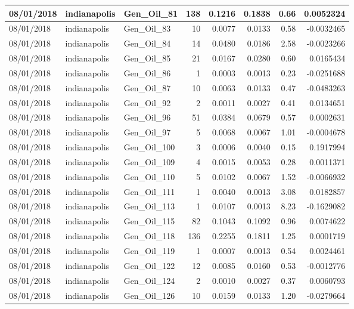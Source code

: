 \documentclass[
  letterpaper,
  DIV=11,
  numbers=noendperiod]{scrartcl}
\begin{document}
\begin{tabular}{l|l|l|r|r|r|r|r}
\hline
08/01/2018 & indianapolis & Gen\_Oil\_81 & 138 & 0.1216 & 0.1838 & 0.66 & 0.0052324\\
\hline
08/01/2018 & indianapolis & Gen\_Oil\_83 & 10 & 0.0077 & 0.0133 & 0.58 & -0.0032465\\
\hline
08/01/2018 & indianapolis & Gen\_Oil\_84 & 14 & 0.0480 & 0.0186 & 2.58 & -0.0023266\\
\hline
08/01/2018 & indianapolis & Gen\_Oil\_85 & 21 & 0.0167 & 0.0280 & 0.60 & 0.0165434\\
\hline
08/01/2018 & indianapolis & Gen\_Oil\_86 & 1 & 0.0003 & 0.0013 & 0.23 & -0.0251688\\
\hline
08/01/2018 & indianapolis & Gen\_Oil\_87 & 10 & 0.0063 & 0.0133 & 0.47 & -0.0483263\\
\hline
08/01/2018 & indianapolis & Gen\_Oil\_92 & 2 & 0.0011 & 0.0027 & 0.41 & 0.0134651\\
\hline
08/01/2018 & indianapolis & Gen\_Oil\_96 & 51 & 0.0384 & 0.0679 & 0.57 & 0.0002631\\
\hline
08/01/2018 & indianapolis & Gen\_Oil\_97 & 5 & 0.0068 & 0.0067 & 1.01 & -0.0004678\\
\hline
08/01/2018 & indianapolis & Gen\_Oil\_100 & 3 & 0.0006 & 0.0040 & 0.15 & 0.1917994\\
\hline
08/01/2018 & indianapolis & Gen\_Oil\_109 & 4 & 0.0015 & 0.0053 & 0.28 & 0.0011371\\
\hline
08/01/2018 & indianapolis & Gen\_Oil\_110 & 5 & 0.0102 & 0.0067 & 1.52 & -0.0066932\\
\hline
08/01/2018 & indianapolis & Gen\_Oil\_111 & 1 & 0.0040 & 0.0013 & 3.08 & 0.0182857\\
\hline
08/01/2018 & indianapolis & Gen\_Oil\_113 & 1 & 0.0107 & 0.0013 & 8.23 & -0.1629082\\
\hline
08/01/2018 & indianapolis & Gen\_Oil\_115 & 82 & 0.1043 & 0.1092 & 0.96 & 0.0074622\\
\hline
08/01/2018 & indianapolis & Gen\_Oil\_118 & 136 & 0.2255 & 0.1811 & 1.25 & 0.0001719\\
\hline
08/01/2018 & indianapolis & Gen\_Oil\_119 & 1 & 0.0007 & 0.0013 & 0.54 & 0.0024461\\
\hline
08/01/2018 & indianapolis & Gen\_Oil\_122 & 12 & 0.0085 & 0.0160 & 0.53 & -0.0012776\\
\hline
08/01/2018 & indianapolis & Gen\_Oil\_124 & 2 & 0.0010 & 0.0027 & 0.37 & 0.0060793\\
\hline
08/01/2018 & indianapolis & Gen\_Oil\_126 & 10 & 0.0159 & 0.0133 & 1.20 & -0.0279664\\

\end{tabular}
\end{document}
